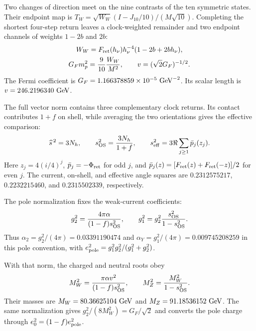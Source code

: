 \documentclass[aps,prx,reprint,longbibliography]{revtex4-2}
\providecommand{\Phis}{\Phi_{\rm ret}}
\providecommand{\Fret}{F_{\rm ret}}
\begin{document}
Two changes of direction meet on the nine contrasts of the ten symmetric states. Their endpoint map is $T_W=\sqrt{W_W}(I-J_{10}/10)/(M\sqrt{10})$. Completing the shortest four-step return leaves a clock-weighted remainder and two endpoint channels of weights $1-2b$ and $2b$:
\begin{equation}
 \begin{gathered}
 W_W=\Fret(h_\nu)h_\nu^{-4}(1-2b+2bh_\nu),\\
 G_Fm_p^2=\frac9{10}\frac{W_W}{M^2},\qquad
 v=(\sqrt2G_F)^{-1/2}.
 \end{gathered}
 \label{eq:fermi}
\end{equation}
The Fermi coefficient is $G_F=1.166378859\times10^{-5}\ {\rm GeV}^{-2}$. Its scalar length is $v=246.2196340\ {\rm GeV}$.

The full vector norm contains three complementary clock returns. Its contact contributes $1+f$ on shell, while averaging the two orientations gives the effective comparison:
\begin{equation}
 \widehat s^{\,2}=3N_h,\qquad
 s_{\rm OS}^2=\frac{3N_h}{1+f},\qquad
 s_{\rm eff}^2=3\Re\sum_{j\ge1}\bar p_j(z_j).
 \label{eq:weak_angles}
\end{equation}
Here $z_j=4(i/4)^j$, $\bar p_j=-\Phis$ for odd $j$, and $\bar p_j(z)=[\Fret(z)+\Fret(-z)]/2$ for even $j$. The current, on-shell, and effective angle squares are $0.2312575217$, $0.2232215460$, and $0.2315502339$, respectively.

The pole normalization fixes the weak-current coefficients:
\begin{equation}
 g_2^2=\frac{4\pi\alpha}{(1-f)s_{\rm OS}^2},\qquad
 g_1^2=g_2^2\frac{s_{\rm OS}^2}{1-s_{\rm OS}^2}.
 \label{eq:weak_coefficients}
\end{equation}
Thus $\alpha_2=g_2^2/(4\pi)=0.03391190474$ and $\alpha_Y=g_1^2/(4\pi)=0.009745208259$ in this pole convention, with $e_{\rm pole}^2=g_1^2g_2^2/(g_1^2+g_2^2)$.

With that norm, the charged and neutral roots obey
\begin{equation}
 M_W^2=\frac{\pi\alpha v^2}{(1-f)s_{\rm OS}^2},\qquad
 M_Z^2=\frac{M_W^2}{1-s_{\rm OS}^2}.
 \label{eq:weak_masses}
\end{equation}
Their masses are $M_W=80.36625104\ {\rm GeV}$ and $M_Z=91.18536152\ {\rm GeV}$. The same normalization gives $g_2^2/(8M_W^2)=G_F/\sqrt2$ and converts the pole charge through $e_0^2=(1-f)e_{\rm pole}^2$.
\end{document}
